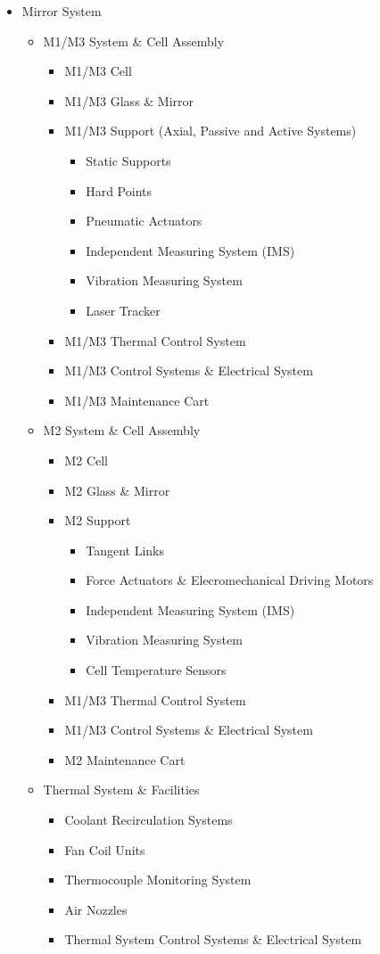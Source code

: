 \begin{small}
\begin{itemize}
	\item Mirror System
	\begin{itemize}
		\item M1/M3 System \& Cell Assembly
			\begin{itemize}
			\item M1/M3 Cell
			\item M1/M3 Glass \& Mirror
			\item M1/M3 Support (Axial, Passive and Active Systems)
				\begin{itemize}
				\item Static Supports
				\item Hard Points
				\item Pneumatic Actuators
				\item Independent Measuring System (IMS)
				\item Vibration Measuring System
				\item Laser Tracker
				\end{itemize}
			\item M1/M3 Thermal Control System
			\item M1/M3 Control Systems \& Electrical System
			\item M1/M3 Maintenance Cart
			\end{itemize}
		\item M2 System \& Cell Assembly
			\begin{itemize}
			\item M2 Cell
			\item M2 Glass \& Mirror
			\item M2 Support
				\begin{itemize}
				\item Tangent Links
				\item Force Actuators \& Elecromechanical Driving Motors
				\item Independent Measuring System (IMS)
				\item Vibration Measuring System
				\item Cell Temperature Sensors
				\end{itemize}
			\item M1/M3 Thermal Control System
			\item M1/M3 Control Systems \& Electrical System
			\item M2 Maintenance Cart
			\end{itemize}
		\item Thermal System \& Facilities
			\begin{itemize}
			\item Coolant Recirculation Systems
			\item Fan Coil Units
			\item Thermocouple Monitoring System
			\item Air Nozzles
			\item Thermal System Control Systems \& Electrical System
			\end{itemize}
	\end{itemize}


\end{itemize}
\end{small}
